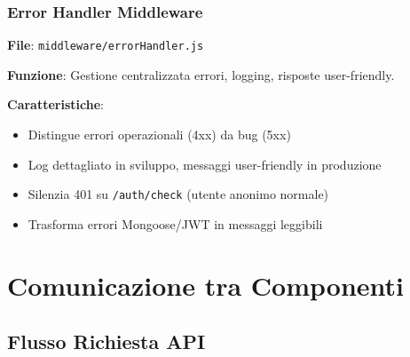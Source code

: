 \documentclass[11pt,a4paper]{article}
\begin{document}
\subsubsection{Error Handler Middleware}

\textbf{File}: \texttt{middleware/errorHandler.js}

\textbf{Funzione}: Gestione centralizzata errori, logging, risposte user-friendly.

\textbf{Caratteristiche}:
\begin{itemize}
    \item Distingue errori operazionali (4xx) da bug (5xx)
    \item Log dettagliato in sviluppo, messaggi user-friendly in produzione
    \item Silenzia 401 su \texttt{/auth/check} (utente anonimo normale)
    \item Trasforma errori Mongoose/JWT in messaggi leggibili
\end{itemize}

\section{Comunicazione tra Componenti}

\subsection{Flusso Richiesta API}
\end{document}
